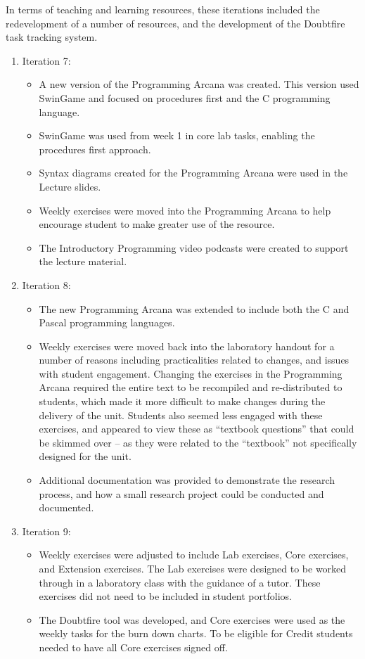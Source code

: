 In terms of teaching and learning resources, these iterations included the redevelopment of a number of resources, and the development of the Doubtfire task tracking system.

\begin{enumerate}
  \item Iteration 7: 
  \begin{itemize}[noitemsep,nolistsep]
  	\item A new version of the Programming Arcana was created. This version used SwinGame and focused on procedures first and the C programming language.
  	\item SwinGame was used from week 1 in core lab tasks, enabling the procedures first approach.
  	\item Syntax diagrams created for the Programming Arcana were used in the Lecture slides.
  	\item Weekly exercises were moved into the Programming Arcana to help encourage student to make greater use of the resource.
  	\item The Introductory Programming video podcasts were created to support the lecture material.
  \end{itemize}

  \item Iteration 8:
  \begin{itemize}[noitemsep,nolistsep]
  	\item The new Programming Arcana was extended to include both the C and Pascal programming languages.
  	\item Weekly exercises were moved back into the laboratory handout for a number of reasons including practicalities related to changes, and issues with student engagement. Changing the exercises in the Programming Arcana required the entire text to be recompiled and re-distributed to students, which made it more difficult to make changes during the delivery of the unit. Students also seemed less engaged with these exercises, and appeared to view these as ``textbook questions'' that could be skimmed over -- as they were related to the ``textbook'' not specifically designed for the unit. 
  	\item Additional documentation was provided to demonstrate the research process, and how a small research project could be conducted and documented.
  \end{itemize}

  \item Iteration 9:
  \begin{itemize}[noitemsep,nolistsep]
  	\item Weekly exercises were adjusted to include Lab exercises, Core exercises, and Extension exercises. The Lab exercises were designed to be worked through in a laboratory class with the guidance of a tutor. These exercises did not need to be included in student portfolios.
  	\item The Doubtfire tool was developed, and Core exercises were used as the weekly tasks for the burn down charts. To be eligible for Credit students needed to have all Core exercises signed off.
  \end{itemize}
\end{enumerate}


